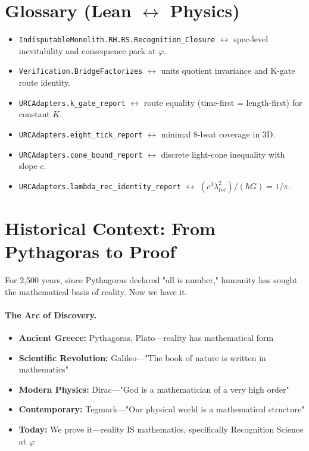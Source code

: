 \documentclass[11pt,a4paper,twoside]{article}
\numberwithin{equation}{section}
\theoremstyle{customthm}
\theoremstyle{customdef}
\theoremstyle{customrem}
\begin{document}
\section*{Glossary (Lean \texorpdfstring{$\leftrightarrow$}{↔} Physics)}\label{sec:glossary}
\begin{itemize}[leftmargin=*]
  \item \texttt{IndisputableMonolith.RH.RS.Recognition\_Closure} $\leftrightarrow$ spec-level inevitability and consequence pack at $\varphi$.
  \item \texttt{Verification.BridgeFactorizes} $\leftrightarrow$ units quotient invariance and K-gate route identity.
  \item \texttt{URCAdapters.k\_gate\_report} $\leftrightarrow$ route equality (time-first = length-first) for constant $K$.
  \item \texttt{URCAdapters.eight\_tick\_report} $\leftrightarrow$ minimal $8$-beat coverage in 3D.
  \item \texttt{URCAdapters.cone\_bound\_report} $\leftrightarrow$ discrete light-cone inequality with slope $c$.
  \item \texttt{URCAdapters.lambda\_rec\_identity\_report} $\leftrightarrow$ $(c^3\lambda_{\mathrm{rec}}^2)/(\hbar G)=1/\pi$.
\end{itemize}

\section*{Historical Context: From Pythagoras to Proof}\label{sec:history}

For 2,500 years, since Pythagoras declared "all is number," humanity has sought the mathematical basis of reality. Now we have it.

\paragraph{The Arc of Discovery.}
\begin{itemize}[leftmargin=*,topsep=2pt,itemsep=2pt]
\item \textbf{Ancient Greece:} Pythagoras, Plato—reality has mathematical form
\item \textbf{Scientific Revolution:} Galileo—"The book of nature is written in mathematics"
\item \textbf{Modern Physics:} Dirac—"God is a mathematician of a very high order"
\item \textbf{Contemporary:} Tegmark—"Our physical world is a mathematical structure"
\item \textbf{Today:} We prove it—reality IS mathematics, specifically Recognition Science at $\varphi$
\end{itemize}
\end{document}
